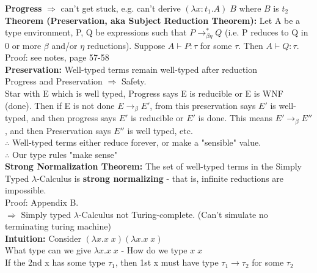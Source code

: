 \documentclass[11pt]{article}
\begin{document}
{\bf Progress} $\Rightarrow$ can't get stuck, e.g. can't derive $(\lambda x:t_1.A)\;B$ where $B$ is $t_2$ \\

{\bf Theorem (Preservation, aka Subject Reduction Theorem):} Let A be a type environment, P, Q be expressions such that $P \rightarrow_{\beta \eta}^* Q$ (i.e. P reduces to Q in 0 or more $\beta$ and/or $\eta$ reductions). Suppose $A \vdash P: \tau$ for some $\tau$. Then $A \vdash Q:\tau$. \\

Proof: see notes, page 57-58 \\

{\bf Preservation:} Well-typed terms remain well-typed after reduction \\

Progress and Preservation $\Rightarrow$ Safety. \\

Star with E which is well typed, Progress says E is reducible or E is WNF (done). Then if E is not done $E \rightarrow_\beta E'$, from this preservation says $E'$ is well-typed, and then progress says $E'$ is reducible or $E'$ is done. This means $E' \rightarrow_\beta E''$, and then Preservation says $E''$ is well typed, etc. \\

$\therefore$ Well-typed terms either reduce forever, or make a "sensible" value. \\

$\therefore$ Our type rules "make sense" \\

{\bf Strong Normalization Theorem:} The set of well-typed terms in the Simply Typed $\lambda$-Calculus is {\bf strong normalizing} - that is, infinite reductions are impossible. \\

Proof: Appendix B. \\

$\Rightarrow$ Simply typed $\lambda$-Calculus not Turing-complete. (Can't simulate no terminating turing machine)\\

{\bf Intuition:} Consider $(\lambda x.x\;x)(\lambda x.x\;x)$ \\

What type can we give $\lambda x.x\;x$ - How do we type $x\;x$\\

If the 2nd x has some type $\tau_1$, then 1st x must have type $\tau_1 \rightarrow \tau_2$ for some $\tau_2$ \\
\end{document}
